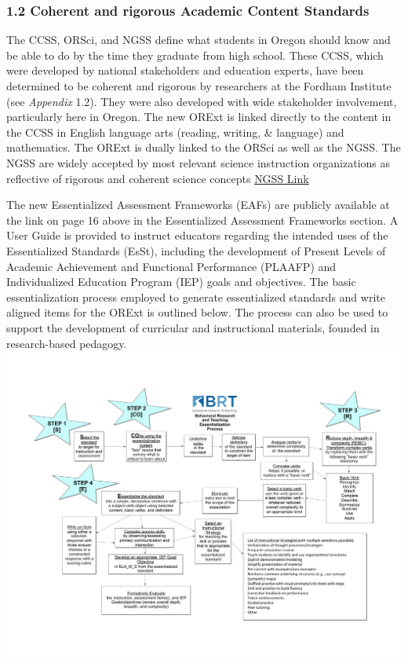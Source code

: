 \documentclass[]{article}
\begin{document}
\clearpage

\subsubsection{1.2 Coherent and rigorous Academic Content
Standards}\label{coherent-and-rigorous-academic-content-standards}

The CCSS, ORSci, and NGSS define what students in Oregon should know and
be able to do by the time they graduate from high school. These CCSS,
which were developed by national stakeholders and education experts,
have been determined to be coherent and rigorous by researchers at the
Fordham Institute (see \emph{Appendix} 1.2). They were also developed
with wide stakeholder involvement, particularly here in Oregon. The new
ORExt is linked directly to the content in the CCSS in English language
arts (reading, writing, \& language) and mathematics. The ORExt is
dually linked to the ORSci as well as the NGSS. The NGSS are widely
accepted by most relevant science instruction organizations as
reflective of rigorous and coherent science concepts
\color{link}\href{http://www.nextgenscience.org/support-scientific-engineering-and-education-communities}{NGSS
Link} \color{black}

The new Essentialized Assessment Frameworks (EAFs) are publicly
available at the link on page 16 above in the Essentialized Assessment
Frameworks section. A User Guide is provided to instruct educators
regarding the intended uses of the Essentialized Standards (EsSt),
including the development of Present Levels of Academic Achievement and
Functional Performance (PLAAFP) and Individualized Education Program
(IEP) goals and objectives. The basic essentialization process employed
to generate essentialized standards and write aligned items for the
ORExt is outlined below. The process can also be used to support the
development of curricular and instructional materials, founded in
research-based pedagogy. \FloatBarrier
\includegraphics{Figures/Essentialization/Essentialization.pdf} \newpage
\end{document}
